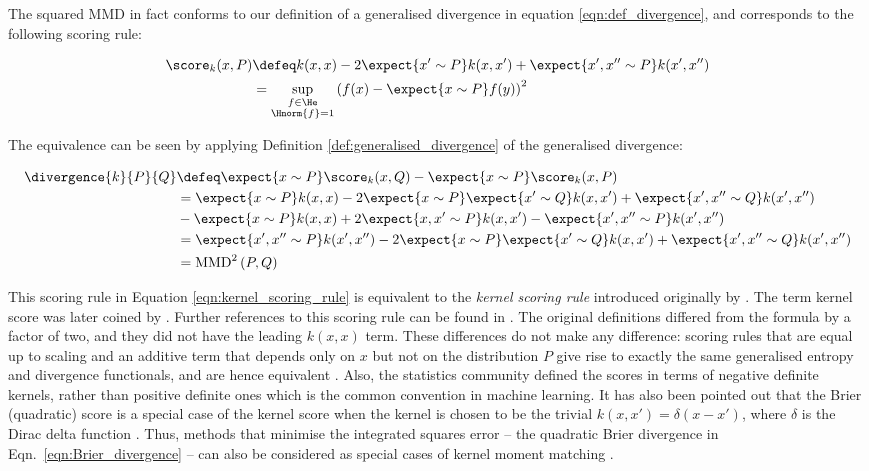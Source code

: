 The squared MMD in fact conforms to our definition of a generalised divergence in equation \eqref{eqn:def_divergence}, and corresponds to the following scoring rule:

\begin{align}
	\score_{k}(x,P) &\defeq k(x,x) - 2 \expect{x'\sim P} k(x,x') + \expect{x',x''\sim P}k(x',x'') \label{eqn:kernel_scoring_rule}\\
		&=  \sup_{\substack{f\in\He\\\Hnorm{f}=1}}\left( f(x)- \expect{x\sim P} f(y) \right)^2
\end{align}

The equivalence can be seen by applying Definition \ref{def:generalised_divergence} of the generalised divergence:

\begin{align}
	\divergence{k}{P}{Q} &\defeq \expect{x\sim P} \score_{k}(x,Q) - \expect{x\sim P} \score_{k}(x,P)\\
		&= \expect{x\sim P} k(x,x) - 2 \expect{x\sim P}\expect{x'\sim Q} k(x,x') + \expect{x',x''\sim Q}k(x',x'')\\
		&- \expect{x\sim P} k(x,x) + 2 \expect{x,x'\sim P} k(x,x') - \expect{x',x''\sim P}k(x',x'') \\
		&= \expect{x',x''\sim P}k(x',x'') - 2 \expect{x\sim P}\expect{x'\sim Q} k(x,x') + \expect{x',x''\sim Q}k(x',x'')\\
		&= \mbox{MMD}^2\left(P,Q\right)
\end{align}

This scoring rule in Equation \eqref{eqn:kernel_scoring_rule} is equivalent to the \emph{kernel scoring rule} introduced originally by \citet{Eaton1982}. The term kernel score was later coined by \citet{Dawid2007}. Further references to this scoring rule can be found in \citep{Eaton1996,Gneiting2007}. The original definitions differed from the formula by a factor of two, and they did not have the leading $k(x,x)$ term. These differences do not make any difference: scoring rules that are equal up to scaling and an additive term that depends only on $x$ but not on the distribution $P$ give rise to exactly the same generalised entropy and divergence functionals, and are hence equivalent \citep{Dawid2007}. Also, the statistics community defined the scores in terms of negative definite kernels, rather than positive definite ones which is the common convention in machine learning. It has also been pointed out that the Brier (quadratic) score is a special case of the kernel score when the kernel is chosen to be the trivial $k(x,x') = \delta(x - x')$, where $\delta$ is the Dirac delta function \citep{Dawid2007}.
\cbstart
Thus, methods that minimise the integrated squares error -- \ie the quadratic Brier divergence in Eqn.\ \eqref{eqn:Brier_divergence} -- can also be considered as special cases of kernel moment matching \citep{Scott99,Girolami03,Mukherjee99}.
\cbend

